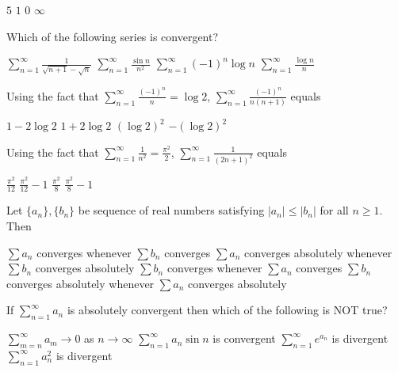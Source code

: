 \documentclass[10pt]{exam}
\begin{document}
\begin{questions}
\begin{oneparchoices}
\choice $5      $ 
\choice $1      $ 
\choice $0      $ 
\choice $\infty $ 
\end{oneparchoices}

\question
Which of the following series is convergent?

\begin{choices}
\choice $\sum_{n=1}^{\infty} \frac{1}{\sqrt{n+1}-\sqrt{n}}$
\choice $\sum_{n=1}^{\infty} \frac{\sin n}{n^2}$
\choice $\sum_{n=1}^{\infty} (-1)^n \log n$
\choice $\sum_{n=1}^{\infty} \frac{\log n}{n}$
\end{choices}


\question
Using the fact that $\sum_{n=1}^{\infty} \frac{(-1)^n}{n}=\log 2$, $\sum_{n=1}^{\infty} \frac{(-1)^n}{n(n+1)}$ equals

\begin{oneparchoices}
\choice $1-2 \log 2$
\choice $1+2 \log 2$
\choice $(\log 2)^2$
\choice $-(\log 2)^2$
\end{oneparchoices}

\question
Using the fact that $\sum_{n=1}^{\infty} \frac{1}{n^2}=\frac{\pi^2}{2}$, $\sum_{n=1}^{\infty} \frac{1}{(2n+1)^2}$ equals

\begin{oneparchoices}
\choice $\frac{\pi^2}{12}$
\choice $\frac{\pi^2}{12} -1$
\choice $\frac{\pi^2}{8}$
\choice $\frac{\pi^2}{8}-1$
\end{oneparchoices}

\question
Let $\{a_n\},\{b_n\}$ be sequence of real numbers satisfying $|a_n| \leq |b_n|$ for all $n \geq 1$. Then

\begin{choices}
\choice $\sum a_n$ converges whenever $\sum b_n$ converges
\choice $\sum a_n$ converges absolutely whenever $\sum b_n$ converges absolutely
\choice $\sum b_n$ converges whenever $\sum a_n$ converges
\choice $\sum b_n$ converges absolutely whenever $\sum a_n$ converges absolutely
\end{choices}

\question
If $\sum_{n=1}^{\infty} a_n$ is absolutely convergent then which of the following is NOT true?

\begin{choices}
\choice $\sum_{m=n}^{\infty} a_m \rightarrow 0$ as $n \rightarrow \infty$
\choice $\sum_{n=1}^{\infty} a_n \sin n$ is convergent
\choice $\sum_{n=1}^{\infty} e^{a_n}$ is divergent
\choice $\sum_{n=1}^{\infty} a_n^2$ is divergent
\end{choices}


\end{questions}
\end{document}
